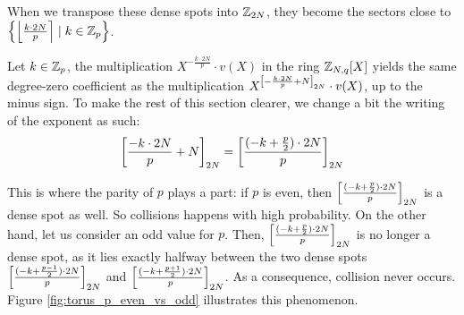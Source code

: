 When we transpose these dense spots into $\mathbb{Z}_{2N}$, they become the sectors close to $\left \{ \left \lfloor \frac{k \cdot 2N}{p} \right \rceil \mid k \in \mathbb{Z}_p \right \}$. 

Let $k \in \mathbb{Z}_p$, the multiplication $X^{- \frac{k \cdot 2N}{p}} \cdot v(X)$ in the ring $\mathbb{Z}_{N,q}[X]$ yields the same degree-zero coefficient as the multiplication  $X^{\left [ - \frac{k \cdot 2N}{p} + N \right ]_{2N}} \cdot v(X)$, up to the minus sign. To make the rest of this section clearer, we change a bit the writing of the exponent as such: 
\[\left [ 
	\frac{
		-k \cdot 2N
	}
	{
		p
	}
	+ N
 \right ]_{2N} = 
\left [ 
	\frac{
		(-k + \frac p 2 ) \cdot 2N
	}
	{p}
 \right ]_{2N}\]


This is where the parity of $p$ plays a part: if $p$ is even, then $\left [ 
	\frac{
		(-k + \frac p 2 ) \cdot 2N
	}
	{p}
 \right ]_{2N}$ is a dense spot as well. So collisions happens with high probability.  On the other hand, let us consider an odd value for $p$. Then, $\left [ 
	\frac{
		(-k + \frac p 2 ) \cdot 2N
	}
	{p}
 \right ]_{2N}$ is no longer a dense spot, as it lies exactly halfway between the two dense spots $\left [ 
	\frac{
		(-k + \frac {p-1} {2} ) \cdot 2N
	}
	{p}
 \right ]_{2N}$ and $\left [ 
	\frac{
		(-k + \frac {p+1} {2} ) \cdot 2N
	}
	{p}
 \right ]_{2N}$. As a consequence, collision never occurs. Figure \ref{fig:torus_p_even_vs_odd} illustrates this phenomenon.



